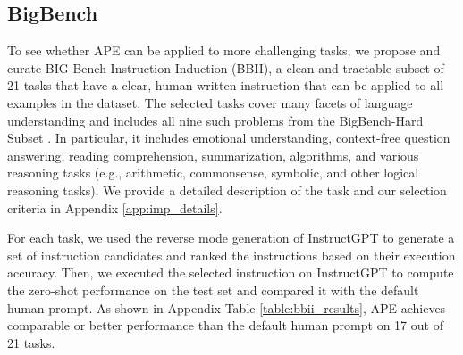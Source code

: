 
\subsection{BigBench}\label{sec:bigbench}
To see whether APE can be applied to more challenging tasks, we propose and curate BIG-Bench Instruction Induction (BBII), a clean and tractable subset of 21 tasks that have a clear, human-written instruction that can be applied to all examples in the dataset. The selected tasks cover many facets of language understanding and includes all nine such problems from the BigBench-Hard Subset \citep{suzgun2022challenging}. In particular, it includes emotional understanding, context-free question answering, reading comprehension, summarization, algorithms, and various reasoning tasks (e.g., arithmetic, commonsense, symbolic, and other logical reasoning tasks). We provide a detailed description of the task and our selection criteria in Appendix \ref{app:imp_details}. 

For each task, we used the reverse mode generation of InstructGPT to generate a set of instruction candidates and ranked the instructions based on their execution accuracy. Then, we executed the selected instruction on InstructGPT to compute the zero-shot performance on the test set and compared it with the default human prompt. As shown in Appendix Table \ref{table:bbii_results}, APE achieves comparable or better performance than the default human prompt on 17 out of 21 tasks.

